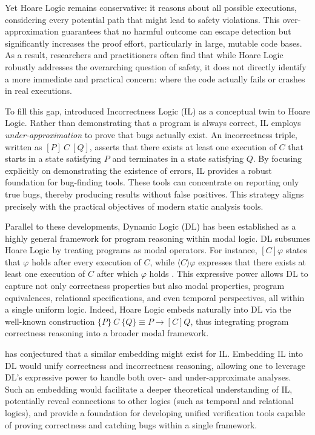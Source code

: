 Yet Hoare Logic remains conservative: it reasons about all possible executions, considering every potential path that might lead to safety violations. This over-approximation guarantees that no harmful outcome can escape detection but significantly increases the proof effort, particularly in large, mutable code bases. As a result, researchers and practitioners often find that while Hoare Logic robustly addresses the overarching question of safety, it does not directly identify a more immediate and practical concern: where the code actually fails or crashes in real executions.

To fill this gap, \cite{ohearnincorrectness2020} introduced Incorrectness Logic (IL) as a conceptual twin to Hoare Logic. Rather than demonstrating that a program is always correct, IL employs \textit{under-approximation} to prove that bugs actually exist. An incorrectness triple, written as $[P]~C~[Q]$, asserts that there exists at least one execution of $C$ that starts in a state satisfying $P$ and terminates in a state satisfying $Q$. By focusing explicitly on demonstrating the existence of errors, IL provides a robust foundation for bug-finding tools. These tools can concentrate on reporting only true bugs, thereby producing results without false positives. This strategy aligns precisely with the practical objectives of modern static analysis tools.

Parallel to these developments, Dynamic Logic (DL) has been established as a highly general framework for program reasoning within modal logic. DL subsumes Hoare Logic by treating programs as modal operators. For instance, $[C]\varphi$ states that $\varphi$ holds after every execution of $C$, while $\langle C \rangle \varphi$ expresses that there exists at least one execution of $C$ after which $\varphi$ holds \cite{harel2001dynamic}. This expressive power allows DL to capture not only correctness properties but also modal properties, program equivalences, relational specifications, and even temporal perspectives, all within a single uniform logic. Indeed, Hoare Logic embeds naturally into DL via the well-known construction $\{P\}~C~\{Q\} \equiv P \rightarrow [C]Q$, thus integrating program correctness reasoning into a broader modal framework.

\cite{ohearnincorrectness2020} has conjectured that a similar embedding might exist for IL. Embedding IL into DL would unify correctness and incorrectness reasoning, allowing one to leverage DL’s expressive power to handle both over- and under-approximate analyses. Such an embedding would facilitate a deeper theoretical understanding of IL, potentially reveal connections to other logics (such as temporal and relational logics), and provide a foundation for developing unified verification tools capable of proving correctness and catching bugs within a single framework.

